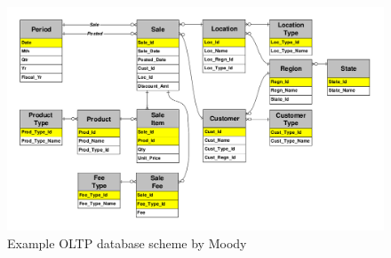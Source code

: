 
\begin{figure}
  \centering
  \includegraphics[width=\linewidth]{images/exampleDatabase}
  \caption{Example OLTP database scheme by Moody \andothers \cite{moody2000enterprise}}
  \label{fig:exampleDatabase}
\end{figure}
